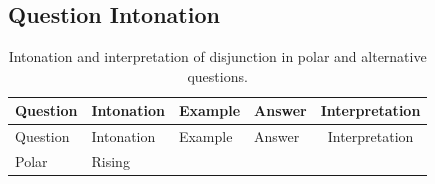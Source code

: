 \documentclass[oneside]{report}
\theoremstyle{definition}
\theoremstyle{definition}
\theoremstyle{definition}
\theoremstyle{remark}
\begin{document}
\subsection{Question Intonation}\label{question-intonation}
\begin{longtable}[]{@{}llllc@{}}
\caption{\label{tab:questions} Intonation and interpretation of disjunction
in polar and alternative questions.}\tabularnewline
\toprule
\begin{minipage}[b]{0.12\columnwidth}\raggedright\strut
Question\strut
\end{minipage} & \begin{minipage}[b]{0.11\columnwidth}\raggedright\strut
Intonation\strut
\end{minipage} & \begin{minipage}[b]{0.39\columnwidth}\raggedright\strut
Example\strut
\end{minipage} & \begin{minipage}[b]{0.10\columnwidth}\raggedright\strut
Answer\strut
\end{minipage} & \begin{minipage}[b]{0.14\columnwidth}\centering\strut
Interpretation\strut
\end{minipage}\tabularnewline
\midrule
\endfirsthead
\toprule
\begin{minipage}[b]{0.12\columnwidth}\raggedright\strut
Question\strut
\end{minipage} & \begin{minipage}[b]{0.11\columnwidth}\raggedright\strut
Intonation\strut
\end{minipage} & \begin{minipage}[b]{0.39\columnwidth}\raggedright\strut
Example\strut
\end{minipage} & \begin{minipage}[b]{0.10\columnwidth}\raggedright\strut
Answer\strut
\end{minipage} & \begin{minipage}[b]{0.14\columnwidth}\centering\strut
Interpretation\strut
\end{minipage}\tabularnewline
\midrule
\endhead
\begin{minipage}[t]{0.12\columnwidth}\raggedright\strut
Polar\strut
\end{minipage} & \begin{minipage}[t]{0.11\columnwidth}\raggedright\strut
Rising\strut
\end{minipage} & \begin{minipage}[t]{0.39\columnwidth}\raggedright\strut

\end{minipage}
\end{longtable}
\end{document}
